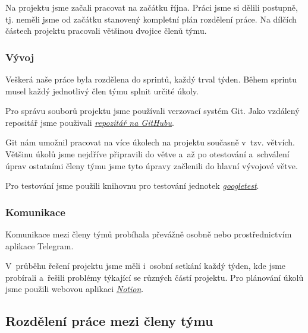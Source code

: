 \documentclass[a4paper, 11pt]{article}
\begin{document}
	Na projektu jsme začali pracovat na začátku října. Práci jsme si dělili postupně, tj. neměli jsme od začátku
	stanovený kompletní plán rozdělení práce. Na dílčích částech projektu pracovali většinou
	dvojice členů týmu.

	\subsubsection{Vývoj}

	Veškerá naše práce byla rozdělena do sprintů, každý trval týden. Během sprintu musel každý jednotlivý člen týmu
	splnit určité úkoly.

	Pro správu souborů projektu jsme používali verzovací systém Git. Jako vzdálený repositář jsme použivali
	\href{https://github.com/NickSettler/ifj_proj_2022}{\textit{repozitář na GitHubu}}.

	Git nám umožnil pracovat na více úkolech na projektu současně v~tzv. větvích. Většinu úkolů jsme nejdříve
	připravili do větve a~až po otestování a~schválení úprav ostatními členy týmu jsme tyto úpravy začlenili do
	hlavní vývojové větve.

	Pro testování jsme použili knihovnu pro testování jednotek \href{https://github.com/google/googletest}{\textit{googletest}}.

	\subsubsection{Komunikace}

	Komunikace mezi členy týmů probíhala převážně osobně nebo prostřednictvím aplikace Telegram.

	V~průběhu řešení projektu jsme měli i~osobní setkání každý týden, kde jsme probírali a~řešili problémy
	týkající se různých částí projektu. Pro plánování úkolů jsme použili webovou aplikaci \href{https://www.notion.so/378b8a4e4c564637be15b61858153ba3?v=438ac593c40b4649974738e0dc0ae2a3}{\textit{Notion}}.

	\subsection{Rozdělení práce mezi členy týmu}
\end{document}
